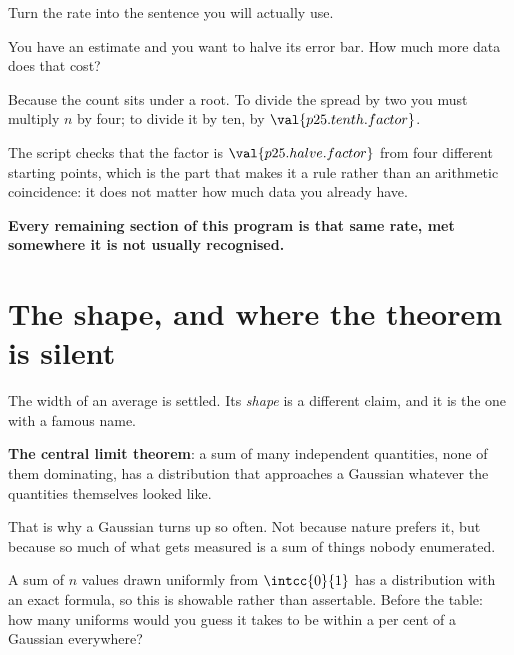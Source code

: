 \begin{fr}
Turn the rate into the sentence you will actually use.

You have an estimate and you want to halve its error bar. How much more data
does that cost?
\dotline
\nextframe
\end{fr}

\begin{fr}

Because the count sits under a root. To divide the spread by two you must
multiply $n$ by four; to divide it by ten, by
$\val{p25.tenth.factor}$.

The script checks that the factor is $\val{p25.halve.factor}$ from four
different starting points, which is the part that makes it a rule rather than
an arithmetic coincidence: it does not matter how much data you already have.

\textbf{Every remaining section of this program is that same rate, met
somewhere it is not usually recognised.}
\end{fr}

\section{The shape, and where the theorem is silent}
\label{sec:P25-clt}

\begin{fr}
The width of an average is settled. Its \emph{shape} is a different claim, and
it is the one with a famous name.

\textbf{The central limit theorem}: a sum of many independent quantities, none
of them dominating, has a distribution that approaches a Gaussian \dash{}
whatever the quantities themselves looked like.

That is why a Gaussian turns up so often. Not because nature prefers it, but
because so much of what gets measured is a sum of things nobody enumerated.

A sum of $n$ values drawn uniformly from $\intcc{0}{1}$ has a distribution
with an exact formula, so this is showable rather than assertable. Before the
table: how many uniforms would you guess it takes to be within a per cent of a
Gaussian everywhere?
\dotline
\nextframe
\end{fr}

